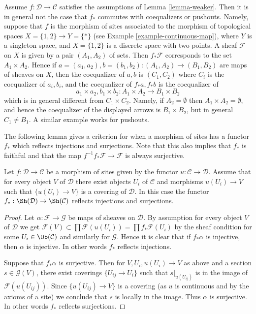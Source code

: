 \begin{example}
\label{example-weaker-not-coequalizer}
Assume $f : \mathcal{D} \to \mathcal{C}$ satisfies the assumptions of
Lemma \ref{lemma-weaker}.
Then it is in general not the case that $f_*$ commutes with coequalizers
or pushouts. Namely, suppose that $f$ is the morphism of sites associated
to the morphism of topological spaces $X = \{1, 2\} \to Y = \{*\}$ (see
Example \ref{example-continuous-map}),
where $Y$ is a singleton space, and $X = \{1, 2\}$ is a discrete
space with two points. A sheaf $\mathcal{F}$ on $X$ is given by a pair
$(A_1, A_2)$ of sets. Then $f_*\mathcal{F}$ corresponds to the
set $A_1 \times A_2$. Hence if
$a = (a_1, a_2), b = (b_1, b_2) : (A_1, A_2) \to (B_1, B_2)$
are maps of sheaves on $X$, then the
coequalizer of $a, b$ is $(C_1, C_2)$ where $C_i$ is the coequalizer of
$a_i, b_i$, and the coequalizer of $f_*a, f_*b$ is the coequalizer of
$$
a_1 \times a_2, b_1 \times b_2 :
A_1 \times A_2 \longrightarrow B_1 \times B_2
$$
which is in general different from $C_1 \times C_2$. Namely, if
$A_2 = \emptyset$ then $A_1 \times A_2 = \emptyset$, and hence the
coequalizer of the displayed arrows is $B_1 \times B_2$, but in general
$C_1 \not = B_1$. A similar example works for pushouts.
\end{example}

\noindent
The following lemma gives a criterion for when a morphism of sites
has a functor $f_*$ which reflects injections and surjections.
Note that this also implies that $f_*$ is faithful and that the
map $f^{-1}f_*\mathcal{F} \to \mathcal{F}$ is always surjective.

\begin{lemma}
\label{lemma-cover-from-below}
Let $f : \mathcal{D} \to \mathcal{C}$ be a morphism of sites given
by the functor $u : \mathcal{C} \to \mathcal{D}$.
Assume that for every object $V$ of $\mathcal{D}$ there exist objects
$U_i$ of $\mathcal{C}$ and morphisms $u(U_i) \to V$ such that
$\{u(U_i) \to V\}$ is a covering of $\mathcal{D}$. In this case the functor
$f_* : \Sh(\mathcal{D}) \to \Sh(\mathcal{C})$ reflects
injections and surjections.
\end{lemma}

\begin{proof}
Let $\alpha : \mathcal{F} \to \mathcal{G}$ be maps of sheaves
on $\mathcal{D}$. By assumption for every object $V$ of $\mathcal{D}$
we get $\mathcal{F}(V) \subset \prod \mathcal{F}(u(U_i)) =
\prod f_*\mathcal{F}(U_i)$ by the sheaf condition
for some $U_i \in \Ob(\mathcal{C})$ and similarly for $\mathcal{G}$.
Hence it is clear that if $f_*\alpha$ is injective, then
$\alpha$ is injective. In other words $f_*$ reflects injections.

\medskip\noindent
Suppose that $f_*\alpha$ is surjective. Then for $V, U_i, u(U_i) \to V$
as above and a section $s \in \mathcal{G}(V)$, there exist coverings
$\{U_{ij} \to U_i\}$ such that $s|_{u(U_{ij})}$ is in the image
of $\mathcal{F}(u(U_{ij}))$. Since $\{u(U_{ij}) \to V\}$ is a covering
(as $u$ is continuous and by the axioms of a site) we conclude that
$s$ is locally in the image. Thus $\alpha$ is surjective. In other
words $f_*$ reflects surjections.
\end{proof}

